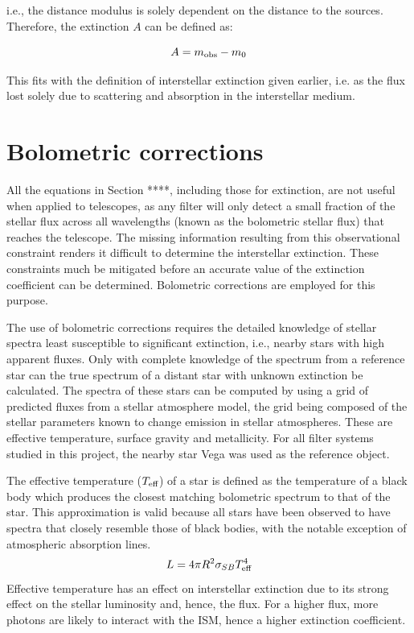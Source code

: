 \documentclass[12pt, a4paper]{report}
\begin{document}
i.e., the distance modulus is solely dependent on the distance to the  sources. Therefore, the extinction $A$ can be defined as:

\begin{equation}
\label{bol_extinc}
A = m_{\textnormal{obs}} - m_{0}
\end{equation}

This fits with the definition of interstellar extinction given earlier, i.e. as the flux lost solely due to scattering and absorption in the interstellar medium.

\section{Bolometric corrections} \label{BC_theory}
All the equations in Section ****, including those for extinction, are not useful when applied to telescopes, as any filter will only detect a small fraction of the stellar flux across all wavelengths (known as the bolometric stellar flux) that reaches the telescope. The missing information resulting from this observational constraint renders it difficult to determine the interstellar extinction. These constraints much be mitigated before an accurate value of the extinction coefficient can be determined. Bolometric corrections are employed for this purpose.

The use of bolometric corrections requires the detailed knowledge of stellar spectra least susceptible to significant extinction, i.e., nearby stars with high apparent fluxes. Only with complete knowledge of the spectrum from a reference star can the true spectrum of a distant star with unknown extinction be calculated. The spectra of these stars can be computed by using a grid of predicted fluxes from a stellar atmosphere model, the grid being composed of the stellar parameters known to change emission in stellar atmospheres. These are effective temperature, surface gravity and metallicity. For all filter systems studied in this project, the nearby star Vega was used as the reference object.

The effective temperature ($T_{\textnormal{eff}}$) of a star is defined as the temperature of a black body which produces the closest matching bolometric spectrum to that of the star. This approximation is valid because all stars have been observed to have spectra that closely resemble those of black bodies, with the notable exception of atmospheric absorption lines.
\begin{equation}
L = 4 \pi R^{2} \sigma_{SB} T_{\textnormal{eff}}^{4}
\label{Teff_def}
\end{equation}
Effective temperature has an effect on interstellar extinction due to its strong effect on the stellar luminosity and, hence, the flux. For a higher flux, more photons are likely to interact with the ISM, hence a higher extinction coefficient.
\end{document}
